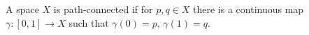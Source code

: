 A space $X$ is path-connected if for $p, q \in X$ there is a continuous map
$\gamma\colon [0, 1] \to X$ such that $\gamma(0) = p$, $\gamma(1) = q$.
